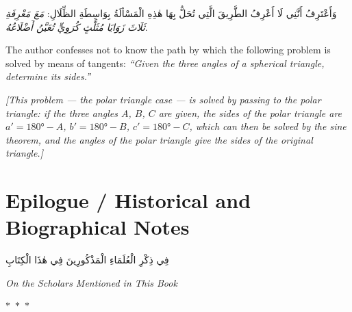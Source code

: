\documentclass[11pt,a4paper]{article}
\theoremstyle{plain}
\theoremstyle{definition}
\theoremstyle{remark}
\newcommand{\ar}[1]{{\arabicfont\beginR #1\endR}}
\newcommand{\bilingualpair}[2]{%
  \par\noindent
  \begin{minipage}[t]{0.48\textwidth}
  #1
  \end{minipage}%
  \hfill
  \begin{minipage}[t]{0.48\textwidth}
  \vspace*{0pt}#2
  \end{minipage}\par\vspace{0.3cm}%
}
\newcommand{\ornament}{\begin{center}\textcolor{goldaccent}{$\ast$~$\ast$~$\ast$}\end{center}}
\begin{document}
\vspace{0.3cm}

\bilingualpair{\ar{وَأَعْتَرِفُ أَنَّنِي لَا أَعْرِفُ الطَّرِيقَ الَّتِي تُحَلُّ بِهَا هٰذِهِ الْمَسْألَةُ بِوَاسِطَةِ الظِّلَالِ: \textit{مَعَ مَعْرِفَةِ ثَلَاثَ زَوَايَا مُثَلَّثٍ كُرَوِيٍّ تُعَيَّنُ أَضْلَاعُهُ}.}}{The author confesses not to know the path by which the following problem is solved by means of tangents: \textit{``Given the three angles of a spherical triangle, determine its sides.''}}

\vspace{0.5cm}

\noindent\textit{[This problem --- the polar triangle case --- is solved by passing to the polar triangle: if the three angles $A$, $B$, $C$ are given, the sides of the polar triangle are $a' = 180° - A$, $b' = 180° - B$, $c' = 180° - C$, which can then be solved by the sine theorem, and the angles of the polar triangle give the sides of the original triangle.]}

\clearpage

\section*{Epilogue / Historical and Biographical Notes}

\begin{center}
\ar{\large فِي ذِكْرِ الْعُلَمَاءِ الْمَذْكُورِينَ فِي هٰذَا الْكِتَابِ}

\vspace{0.2cm}
\textit{On the Scholars Mentioned in This Book}
\end{center}

\ornament
\end{document}
